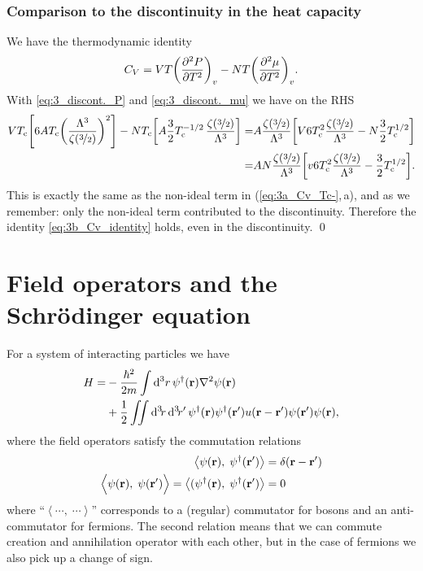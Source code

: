 \documentclass[11pt,letter, swedish, english
]{article}
\begin{document}
\subsubsection{Comparison to the discontinuity in the heat capacity}
We have the thermodynamic identity
\begin{equation}\label{eq:3b_Cv_identity}
C_V=VT\qty(\pdv[2]{P}{T})_v-NT\qty(\pdv[2]{\mu}{T})_v.
\end{equation}
With \eqref{eq:3_discont._P} and \eqref{eq:3_discont._mu} we have on
the RHS
\begin{equation}
\begin{aligned}
VT_{\text{c}}\qty[6AT_{\text{c}}\qty(\frac{\Lambda^3}{\zeta(\nicefrac{3}{2})})^2]
-NT_{\text{c}}\qty[A\frac{3}{2}
T_{\text{c}}^{-1/2}\,\frac{\zeta(\nicefrac{3}{2})}{\Lambda^3}]
=&A\frac{\zeta(\nicefrac{3}{2})}{\Lambda^3}
\qty[V6T_{\text{c}}^2\frac{\zeta(\nicefrac{3}{2})}{\Lambda^3}
-N\frac{3}{2}T_{\text{c}}^{1/2}]\\
=&AN\frac{\zeta(\nicefrac{3}{2})}{\Lambda^3}
\qty[v6T_{\text{c}}^2\frac{\zeta(\nicefrac{3}{2})}{\Lambda^3}
-\frac{3}{2}T_{\text{c}}^{1/2}].
\end{aligned}
\end{equation}
This is exactly the same as the non-ideal term in
(\ref{eq:3a_Cv_Tc-},\,a), and as we remember: only the non-ideal term
contributed to the discontinuity. Therefore the identity
\eqref{eq:3b_Cv_identity} holds, even in the discontinuity.
\qed



\section{Field operators and the Schrödinger equation}
\newcommand{\scomm}[2]{\left\langle#1,\;#2\right\rangle}
\newcommand{\Scomm}[2]{\langle#1,\;#2\rangle}
\newcommand{\commute}[1]{\overbrace{#1}^{\text{commute}}}
For a system of interacting particles we have
\begin{equation}\label{eq:4_want_this}
\begin{aligned}
H=&-\frac{\hbar^2}{2m}\int\rd^3r\,
\psi^\dagger(\vb{r})\laplacian\psi(\vb{r})\\
&+\frac{1}{2}\iint\rd^3\!r\,\rd^3\!r'\,
\psi^\dagger(\vb{r})\psi^\dagger(\vb{r}')
u(\vb{r}-\vb{r}')\psi(\vb{r}')\psi(\vb{r}),
\end{aligned}
\end{equation}
where the field operators satisfy the commutation relations
\begin{equation}\label{eq:4_comm}
\begin{aligned}
\scomm{\psi(\vb{r})}{\psi^\dagger(\vb{r}')}
&=\delta(\vb{r}-\vb{r}')\\
\scomm{\psi(\vb{r})}{\psi(\vb{r}')\Big.}=
\scomm{(\psi^\dagger(\vb{r})}{\psi^\dagger(\vb{r}')}&=0
\end{aligned}
\end{equation}
where ``$\scomm{\cdots}{\cdots}$'' corresponds to a (regular)
commutator for bosons and an anti-commutator for fermions. The second
relation means that we can commute creation and annihilation operator
with each other, but in the case of fermions we also pick up a change
of sign. 
\end{document}
